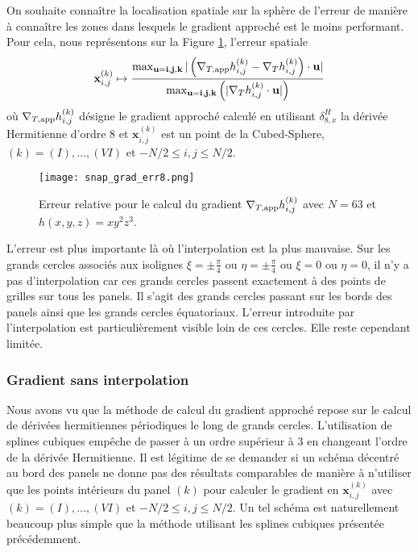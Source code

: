 On souhaite connaître la localisation spatiale sur la sphère de l'erreur de manière à connaître les zones dans lesquels le gradient approché est le moins performant. Pour cela, nous représentons sur la Figure \ref{fig:err_grad}, l'erreur spatiale
\begin{equation}
\mathbf{x}_{i,j}^{(k)} \mapsto \dfrac{\max_{\mathbf{u}=\mathbf{i}, \mathbf{j}, \mathbf{k}} | \left( \nabla_{T,\text{app}} h_{i,j}^{(k)} - \nabla_T h_{i,j}^{(k)} \right)\cdot \mathbf{u} | }{\max_{\mathbf{u}=\mathbf{i}, \mathbf{j}, \mathbf{k}} \left(  | \nabla_T h_{i,j}^{(k)} \cdot \mathbf{u} |\right)}
\end{equation}
où $\nabla_{T,\text{app}} h_{i,j}^{(k)}$ désigne le gradient approché calculé en utilisant $\delta_{8,x}^H$ la dérivée Hermitienne d'ordre 8 et $\mathbf{x}_{i,j}^{(k)}$ est un point de la Cubed-Sphere, $(k)= (I), \ldots , (VI)$ et $-N/2 \leq i,j \leq N/2$.
\begin{figure}[htbp]
\begin{center}
\texttt{[image: snap\_grad\_err8.png]}
\end{center}
\caption{Erreur relative pour le calcul du gradient $\nabla_{T,\text{app}} h_{i,j}^{(k)}$ avec $N=63$ et $h(x,y,z)=x y^2 z^3$. }
\label{fig:err_grad}
\end{figure}
L'erreur est plus importante là où l'interpolation est la plus mauvaise. Sur les grands cercles associés aux isolignes $\xi = \pm \frac{\pi}{4}$ ou $\eta = \pm \frac{\pi}{4}$ ou $\xi = 0$ ou $\eta = 0$, il n'y a pas d'interpolation car ces grands cercles passent exactement à des points de grilles sur tous les panels. Il s'agit des grands cercles passant sur les bords des panels ainsi que les grands cercles équatoriaux. L'erreur introduite par l'interpolation est particulièrement visible loin de ces cercles. Elle reste cependant limitée.













\subsubsection{Gradient sans interpolation}

Nous avons vu que la méthode de calcul du gradient approché repose sur le calcul de dérivées hermitiennes périodiques le long de grands cercles. L'utilisation de splines cubiques empêche de passer à un ordre supérieur à 3 en changeant l'ordre de la dérivée Hermitienne. Il est légitime de se demander si un schéma décentré au bord des panels ne donne pas des résultats comparables de manière à n'utiliser que les points intérieurs du panel $(k)$ pour calculer le gradient en $\mathbf{x}_{i,j}^{(k)}$ avec $(k) = (I), \ldots ,(VI)$ et $-N/2 \leq i,j \leq N/2$. Un tel schéma est naturellement beaucoup plus simple que la méthode utilisant les splines cubiques présentée précédemment.

